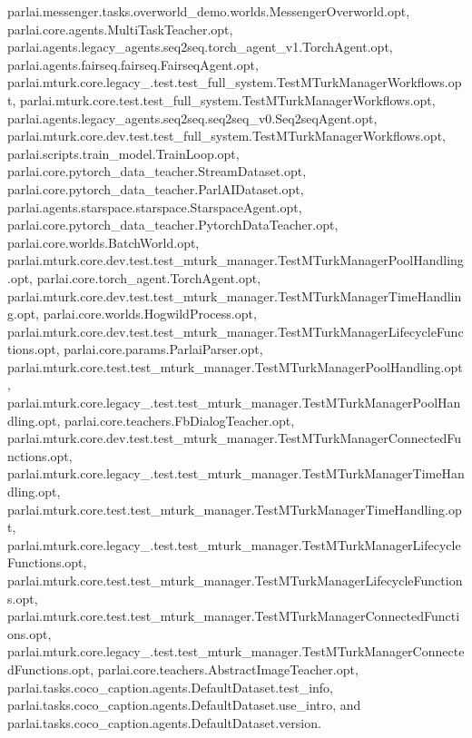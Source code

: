 parlai.\+messenger.\+tasks.\+overworld\+\_\+demo.\+worlds.\+Messenger\+Overworld.\+opt, parlai.\+core.\+agents.\+Multi\+Task\+Teacher.\+opt, parlai.\+agents.\+legacy\+\_\+agents.\+seq2seq.\+torch\+\_\+agent\+\_\+v1.\+Torch\+Agent.\+opt, parlai.\+agents.\+fairseq.\+fairseq.\+Fairseq\+Agent.\+opt, parlai.\+mturk.\+core.\+legacy\+\_.\+test.\+test\+\_\+full\+\_\+system.\+Test\+M\+Turk\+Manager\+Workflows.\+opt, parlai.\+mturk.\+core.\+test.\+test\+\_\+full\+\_\+system.\+Test\+M\+Turk\+Manager\+Workflows.\+opt, parlai.\+agents.\+legacy\+\_\+agents.\+seq2seq.\+seq2seq\+\_\+v0.\+Seq2seq\+Agent.\+opt, parlai.\+mturk.\+core.\+dev.\+test.\+test\+\_\+full\+\_\+system.\+Test\+M\+Turk\+Manager\+Workflows.\+opt, parlai.\+scripts.\+train\+\_\+model.\+Train\+Loop.\+opt, parlai.\+core.\+pytorch\+\_\+data\+\_\+teacher.\+Stream\+Dataset.\+opt, parlai.\+core.\+pytorch\+\_\+data\+\_\+teacher.\+Parl\+A\+I\+Dataset.\+opt, parlai.\+agents.\+starspace.\+starspace.\+Starspace\+Agent.\+opt, parlai.\+core.\+pytorch\+\_\+data\+\_\+teacher.\+Pytorch\+Data\+Teacher.\+opt, parlai.\+core.\+worlds.\+Batch\+World.\+opt, parlai.\+mturk.\+core.\+dev.\+test.\+test\+\_\+mturk\+\_\+manager.\+Test\+M\+Turk\+Manager\+Pool\+Handling.\+opt, parlai.\+core.\+torch\+\_\+agent.\+Torch\+Agent.\+opt, parlai.\+mturk.\+core.\+dev.\+test.\+test\+\_\+mturk\+\_\+manager.\+Test\+M\+Turk\+Manager\+Time\+Handling.\+opt, parlai.\+core.\+worlds.\+Hogwild\+Process.\+opt, parlai.\+mturk.\+core.\+dev.\+test.\+test\+\_\+mturk\+\_\+manager.\+Test\+M\+Turk\+Manager\+Lifecycle\+Functions.\+opt, parlai.\+core.\+params.\+Parlai\+Parser.\+opt, parlai.\+mturk.\+core.\+test.\+test\+\_\+mturk\+\_\+manager.\+Test\+M\+Turk\+Manager\+Pool\+Handling.\+opt, parlai.\+mturk.\+core.\+legacy\+\_.\+test.\+test\+\_\+mturk\+\_\+manager.\+Test\+M\+Turk\+Manager\+Pool\+Handling.\+opt, parlai.\+core.\+teachers.\+Fb\+Dialog\+Teacher.\+opt, parlai.\+mturk.\+core.\+dev.\+test.\+test\+\_\+mturk\+\_\+manager.\+Test\+M\+Turk\+Manager\+Connected\+Functions.\+opt, parlai.\+mturk.\+core.\+legacy\+\_.\+test.\+test\+\_\+mturk\+\_\+manager.\+Test\+M\+Turk\+Manager\+Time\+Handling.\+opt, parlai.\+mturk.\+core.\+test.\+test\+\_\+mturk\+\_\+manager.\+Test\+M\+Turk\+Manager\+Time\+Handling.\+opt, parlai.\+mturk.\+core.\+legacy\+\_.\+test.\+test\+\_\+mturk\+\_\+manager.\+Test\+M\+Turk\+Manager\+Lifecycle\+Functions.\+opt, parlai.\+mturk.\+core.\+test.\+test\+\_\+mturk\+\_\+manager.\+Test\+M\+Turk\+Manager\+Lifecycle\+Functions.\+opt, parlai.\+mturk.\+core.\+test.\+test\+\_\+mturk\+\_\+manager.\+Test\+M\+Turk\+Manager\+Connected\+Functions.\+opt, parlai.\+mturk.\+core.\+legacy\+\_.\+test.\+test\+\_\+mturk\+\_\+manager.\+Test\+M\+Turk\+Manager\+Connected\+Functions.\+opt, parlai.\+core.\+teachers.\+Abstract\+Image\+Teacher.\+opt, parlai.\+tasks.\+coco\+\_\+caption.\+agents.\+Default\+Dataset.\+test\+\_\+info, parlai.\+tasks.\+coco\+\_\+caption.\+agents.\+Default\+Dataset.\+use\+\_\+intro, and parlai.\+tasks.\+coco\+\_\+caption.\+agents.\+Default\+Dataset.\+version.

